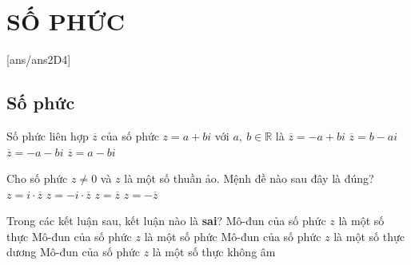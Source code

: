 \section{SỐ PHỨC}
[ans/ans2D4]
\subsection {Số phức}
\begin{ex}%
	Số phức liên hợp $\overline{z}$ của số phức $z=a+bi$ với $a,~b \in \mathbb{R}$ là
	\choice
	{$\overline{z}=-a+bi$}
	{$\overline{z}=b-ai$}
	{$\overline{z}=-a-bi$}
	{\True $\overline{z}=a-bi$}
\end{ex}

\begin{ex}%
	Cho số phức $z\ne 0$ và $ z $ là một số thuần ảo. Mệnh đề nào sau đây là đúng?
	\choice
	{$z=i \cdot \overline{z}$}
	{$z=-i \cdot \overline{z}$}
	{$z=\overline{z}$}
	{\True $z=-\overline{z}$}
\end{ex}

\begin{ex}%
	Trong các kết luận sau, kết luận nào là {\bf sai}?
	\choice
	{Mô-đun của số phức $z$ là một số thực}
	{Mô-đun của số phức $z$ là một số phức}
	{\True Mô-đun của số phức $z$ là một số thực dương}
	{Mô-đun của số phức $z$ là một số thực không âm}
\end{ex}

